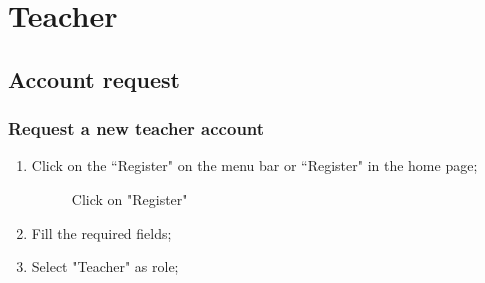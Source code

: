 \documentclass[ManualeUtente]{subfiles}
\begin{document}
\chapter{Teacher}
\section{Account request}
\subsection{Request a new teacher account}
\begin{enumerate}
	\item Click on the \textquotedblleft Register" on the menu bar or \textquotedblleft Register" in the home page;
	\begin{figure}[H]
		\centering
		\caption{Click on "Register"}
		\label{fig:Click on "Register"}
	\end{figure}
	\item Fill the required fields;
	\item Select "Teacher" as role;
	\begin{figure}[H]
		\centering

\end{figure}
\end{enumerate}
\end{document}
